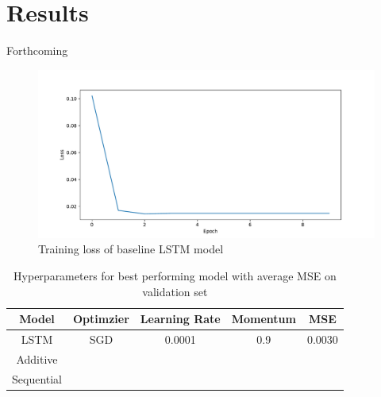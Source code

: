 \section{Results}

Forthcoming

\begin{figure}[H]
	\centering
	\includegraphics[width=\linewidth]{../../figures/vanilla_lstm_training_loss.pdf}
	\caption{Training loss of baseline LSTM model}
	\label{fig:lstm_loss}
\end{figure}

\begin{table}[H]
	\centering
	\begin{tabular}{|c|c|c|c|c|}
	\hline
	Model & Optimzier & Learning Rate & Momentum & MSE \\
	\hline
	LSTM & SGD & 0.0001 & 0.9 & 0.0030 \\
	Additive & & & & \\
	Sequential & & & & \\
	\hline
	\end{tabular}
	\caption{Hyperparameters for best performing model with average MSE on validation set}
	\label{tab:results_summary}
\end{table}